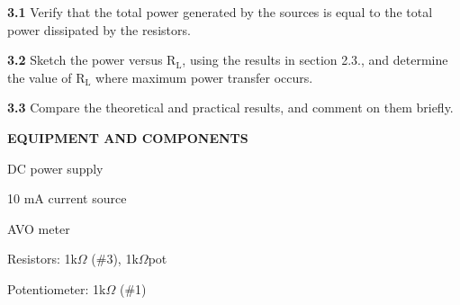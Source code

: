 \documentclass{article}
\begin{document}
{\textbf{3.1} Verify that the total power generated by the sources is equal to the total power dissipated by the resistors.}

{\textbf{3.2} Sketch the power versus R$_{\text{L}}$, using the results in section 2.3., and  determine the value of R$_{\text{L}}$ where maximum power transfer occurs. }

{\textbf{3.3} Compare the theoretical and practical results, and comment on them briefly.}

\vspace{4mm}

{\textbf{EQUIPMENT AND COMPONENTS}}

\vspace{4mm}

{DC power supply}

{10 mA current source}

{AVO meter}

{Resistors: 1k$\Omega$ (\#3), 1k$\Omega$pot}

{Potentiometer: 1k$\Omega$ (\#1)}

\vspace{8mm}
\end{document}
